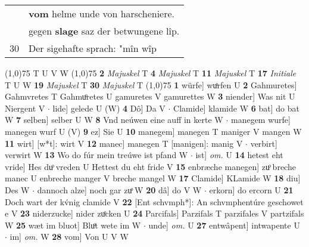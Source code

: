 \documentclass[8pt,a4paper,notitlepage]{article}
\begin{document}
\begin{table}[ht]
\begin{minipage}[t]{0.5\linewidth}
\begin{tabular}{rl}
 & \textbf{vom} helme unde von harscheniere.\\ 
 & gegen \textbf{slage} saz der betwungene lîp.\\ 
30 & Der sigehafte sprach: "mîn wîp\\ 
\end{tabular}
\scriptsize
\line(1,0){75} \newline
T U V W \newline
\line(1,0){75} \newline
\textbf{2} \textit{Majuskel} T  \textbf{4} \textit{Majuskel} T  \textbf{11} \textit{Majuskel} T  \textbf{17} \textit{Initiale} T U W  \textbf{19} \textit{Majuskel} T  \textbf{30} \textit{Majuskel} T  \newline
\line(1,0){75} \newline
\textbf{1} würfe] wuͦrfen U \textbf{2} Gahmuretes] Gahmvretes T Gahmuͦretes U gamuretes V gamurettes W \textbf{3} niender] Was nit U Niergent V  $\cdot$ lide] gelede U (W) \textbf{4} Dô] Da V  $\cdot$ Clamide] klamide W \textbf{6} bat] do bat W \textbf{7} selben] selber U W \textbf{8} Vnd neúwen eine auff in kerte W  $\cdot$ manegem wurfe] manegen wurf U (V) \textbf{9} ez] Sie U \textbf{10} manegem] manegen T maniger V mangen W \textbf{11} wirt] [w*t]: wirt V \textbf{12} manec] manegen T [manigen]: manig V  $\cdot$ verbirt] verwirt W \textbf{13} Wo do fúr mein treúwe ist pfand W  $\cdot$ ist] \textit{om.} U \textbf{14} hetest eht vride] Hes duͦ vreden U Hettest du eht fride V \textbf{15} enbræche manegen] zuͦ breche manec U enbreche manger V breche mangel W \textbf{17} Clamide] KLamide W \textbf{18} diu] Des W  $\cdot$ dannoch alze] noch gar zuͦ W \textbf{20} dâ] do V W  $\cdot$ erkorn] do ercorn U \textbf{21} Doch wart der kv́nig clamide V \textbf{22} [Ent schvmph*]: An schvmphentúre geschowet e V \textbf{23} niderzucke] nider zuͦcken U \textbf{24} Parcifals] Parzifals T parzifales V partzifals W \textbf{25} wæt im bluot] Bluͦt wete im W  $\cdot$ unde] \textit{om.} U \textbf{27} entwâpent] intwapente U  $\cdot$ im] \textit{om.} W \textbf{28} vom] Von U V W \newline
\end{minipage}
\end{table}
\end{document}
